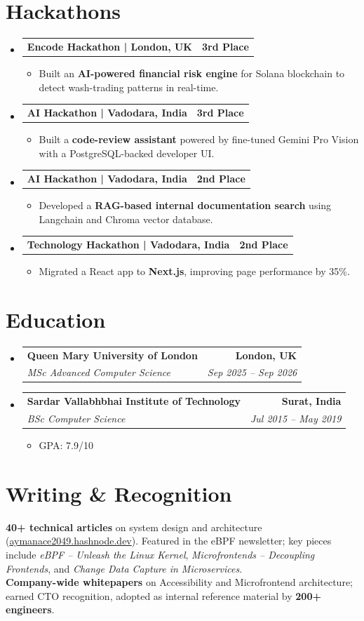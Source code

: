 \documentclass[letterpaper,11pt]{article}
\makeatletter
\newcommand{\resumeItem}[1]{
  \item\small{
    {#1 \vspace{-3pt}}
  }
}
\newcommand{\resumeSubheading}[4]{
  \vspace{-3pt}\item
    \begin{tabular*}{1.0\textwidth}[t]{l@{\extracolsep{\fill}}r}
      \textbf{#1} & \textbf{\small #2} \\
      \textit{\small#3} & \textit{\small #4} \\
    \end{tabular*}\vspace{-7pt}
}
\newcommand{\resumeProjectHeading}[2]{
  \vspace{-3pt}\item
    \begin{tabular*}{1.0\textwidth}[t]{l@{\extracolsep{\fill}}r}
      \textbf{#1} & \textbf{\small #2} \\
    \end{tabular*}\vspace{-7pt}
}
\newcommand{\resumeSubHeadingListStart}{\begin{itemize}[leftmargin=0.0in, label={}]}
\newcommand{\resumeSubHeadingListEnd}{\end{itemize}}
\newcommand{\resumeItemListStart}{\begin{itemize}}
\newcommand{\resumeItemListEnd}{\end{itemize}\vspace{0pt}}
\makeatother
\begin{document}
\section{Hackathons}
\resumeSubHeadingListStart
    \resumeProjectHeading
      {Encode Hackathon | London, UK}{3rd Place}
      \resumeItemListStart
        \resumeItem{Built an \textbf{AI-powered financial risk engine} for Solana blockchain to detect wash-trading patterns in real-time.}
      \resumeItemListEnd
    \resumeProjectHeading
      {AI Hackathon | Vadodara, India}{3rd Place}
      \resumeItemListStart
        \resumeItem{Built a \textbf{code-review assistant} powered by fine-tuned Gemini Pro Vision with a PostgreSQL-backed developer UI.}
      \resumeItemListEnd
    \resumeProjectHeading
      {AI Hackathon | Vadodara, India}{2nd Place}
      \resumeItemListStart
        \resumeItem{Developed a \textbf{RAG-based internal documentation search} using Langchain and Chroma vector database.}
      \resumeItemListEnd
    \resumeProjectHeading
      {Technology Hackathon | Vadodara, India}{2nd Place}
      \resumeItemListStart
        \resumeItem{Migrated a React app to \textbf{Next.js}, improving page performance by 35\%.}
      \resumeItemListEnd
\resumeSubHeadingListEnd

\section{Education}
  \resumeSubHeadingListStart
    \resumeSubheading
      {Queen Mary University of London}{London, UK}
      {MSc Advanced Computer Science}{Sep 2025 -- Sep 2026}
    \resumeSubheading
      {Sardar Vallabhbhai Institute of Technology}{Surat, India}
      {BSc Computer Science}{Jul 2015 -- May 2019}
      \resumeItemListStart
        \resumeItem{GPA: 7.9/10}
      \resumeItemListEnd
  \resumeSubHeadingListEnd

\section{Writing \& Recognition}
\small
\textbf{40+ technical articles} on system design and architecture (\href{https://aymanace2049.hashnode.dev}{aymanace2049.hashnode.dev}). Featured in the eBPF newsletter; key pieces include \textit{eBPF -- Unleash the Linux Kernel}, \textit{Microfrontends -- Decoupling Frontends}, and \textit{Change Data Capture in Microservices}. \\[3pt]
\textbf{Company-wide whitepapers} on Accessibility and Microfrontend architecture; earned CTO recognition, adopted as internal reference material by \textbf{200+ engineers}.
\end{document}
